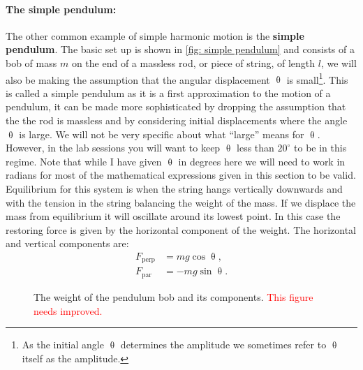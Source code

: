 \paragraph{The simple pendulum:}  The other common example of simple harmonic motion is the \textbf{simple pendulum}. The basic set up is shown in \cref{fig: simple pendulum} and consists of a bob of mass $m$ on the end of a massless rod, or piece of string, of length $l$, we will also be making the assumption that the angular displacement $\uptheta$ is small\footnote{As the initial angle $\uptheta$ determines the amplitude we sometimes refer to $\uptheta$ itself as the amplitude. }. This is called a simple pendulum as it is a first approximation to the motion of a pendulum, it can be made more sophisticated by dropping the assumption that the the rod is massless and by considering initial displacements where the angle $\uptheta$ is large. We will not be very specific about what ``large'' means for $\uptheta$. However, in the lab sessions you will want to keep $\uptheta$ less than $20^{\circ}$ to be in this regime. Note that while I have given $\uptheta$ in degrees here we will need to work in radians for most of the mathematical expressions given in this section to be valid.\\

Equilibrium for this system is when the string hangs vertically downwards and with the tension in the string balancing the weight of the mass. If we displace the mass from equilibrium it will oscillate around its lowest point. In this case the restoring force is given by the horizontal component of the weight. The horizontal and vertical components are:
\begin{align*}
F_{\text{perp}}&=mg\cos\uptheta,\\
F_{\text{par}}&=-mg\sin\uptheta.
\end{align*}

\begin{figure}[ht]
    \centering
    \caption{The weight of the pendulum bob and its components. \textcolor{red}{This figure needs improved.}}
    \label{fig: weight components}
\end{figure}

